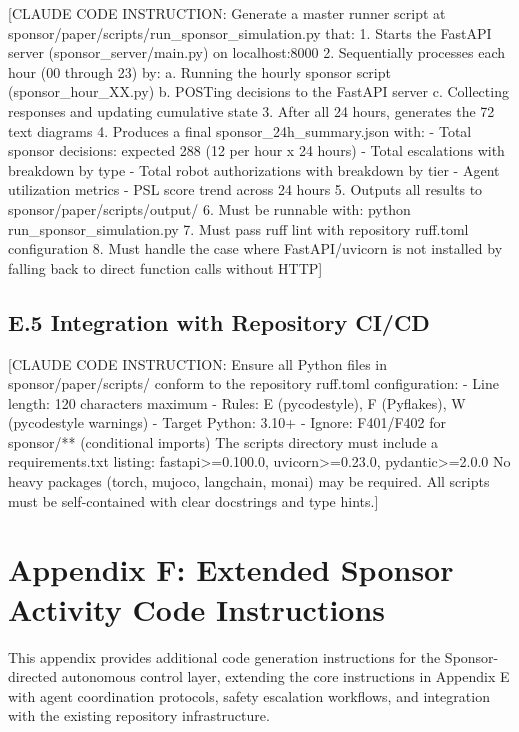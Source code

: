 [CLAUDE CODE INSTRUCTION: Generate a master runner script at
sponsor/paper/scripts/run\_sponsor\_simulation.py that:
1. Starts the FastAPI server (sponsor\_server/main.py) on localhost:8000
2. Sequentially processes each hour (00 through 23) by:
   a. Running the hourly sponsor script (sponsor\_hour\_XX.py)
   b. POSTing decisions to the FastAPI server
   c. Collecting responses and updating cumulative state
3. After all 24 hours, generates the 72 text diagrams
4. Produces a final sponsor\_24h\_summary.json with:
   - Total sponsor decisions: expected 288 (12 per hour x 24 hours)
   - Total escalations with breakdown by type
   - Total robot authorizations with breakdown by tier
   - Agent utilization metrics
   - PSL score trend across 24 hours
5. Outputs all results to sponsor/paper/scripts/output/
6. Must be runnable with: python run\_sponsor\_simulation.py
7. Must pass ruff lint with repository ruff.toml configuration
8. Must handle the case where FastAPI/uvicorn is not installed by
   falling back to direct function calls without HTTP]

\subsection*{E.5 Integration with Repository CI/CD}

[CLAUDE CODE INSTRUCTION: Ensure all Python files in sponsor/paper/scripts/ conform to
the repository ruff.toml configuration:
- Line length: 120 characters maximum
- Rules: E (pycodestyle), F (Pyflakes), W (pycodestyle warnings)
- Target Python: 3.10+
- Ignore: F401/F402 for sponsor/** (conditional imports)
The scripts directory must include a requirements.txt listing:
fastapi>=0.100.0, uvicorn>=0.23.0, pydantic>=2.0.0
No heavy packages (torch, mujoco, langchain, monai) may be required.
All scripts must be self-contained with clear docstrings and type hints.]

\newpage
\section*{Appendix F: Extended Sponsor Activity Code Instructions}

This appendix provides additional code generation instructions for the Sponsor-directed
autonomous control layer, extending the core instructions in Appendix E with agent
coordination protocols, safety escalation workflows, and integration with the existing
repository infrastructure.


